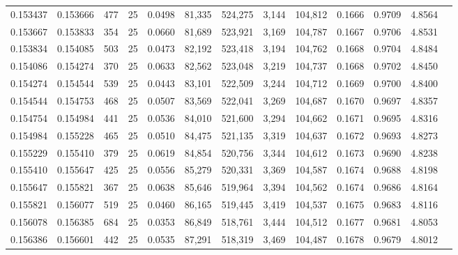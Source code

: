 \begin{tabular}{rrrrrrrrrrrrr}
0.153437 & 0.153666 &   477 &  25 &                                     0.0498 &  81,335 & 524,275 &   3,144 & 104,812 & 0.1666 & 0.9709 & 4.8564 \\
0.153667 & 0.153833 &   354 &  25 &                                     0.0660 &  81,689 & 523,921 &   3,169 & 104,787 & 0.1667 & 0.9706 & 4.8531 \\
0.153834 & 0.154085 &   503 &  25 &                                     0.0473 &  82,192 & 523,418 &   3,194 & 104,762 & 0.1668 & 0.9704 & 4.8484 \\
0.154086 & 0.154274 &   370 &  25 &                                     0.0633 &  82,562 & 523,048 &   3,219 & 104,737 & 0.1668 & 0.9702 & 4.8450 \\
0.154274 & 0.154544 &   539 &  25 &                                     0.0443 &  83,101 & 522,509 &   3,244 & 104,712 & 0.1669 & 0.9700 & 4.8400 \\
0.154544 & 0.154753 &   468 &  25 &                                     0.0507 &  83,569 & 522,041 &   3,269 & 104,687 & 0.1670 & 0.9697 & 4.8357 \\
0.154754 & 0.154984 &   441 &  25 &                                     0.0536 &  84,010 & 521,600 &   3,294 & 104,662 & 0.1671 & 0.9695 & 4.8316 \\
0.154984 & 0.155228 &   465 &  25 &                                     0.0510 &  84,475 & 521,135 &   3,319 & 104,637 & 0.1672 & 0.9693 & 4.8273 \\
0.155229 & 0.155410 &   379 &  25 &                                     0.0619 &  84,854 & 520,756 &   3,344 & 104,612 & 0.1673 & 0.9690 & 4.8238 \\
0.155410 & 0.155647 &   425 &  25 &                                     0.0556 &  85,279 & 520,331 &   3,369 & 104,587 & 0.1674 & 0.9688 & 4.8198 \\
0.155647 & 0.155821 &   367 &  25 &                                     0.0638 &  85,646 & 519,964 &   3,394 & 104,562 & 0.1674 & 0.9686 & 4.8164 \\
0.155821 & 0.156077 &   519 &  25 &                                     0.0460 &  86,165 & 519,445 &   3,419 & 104,537 & 0.1675 & 0.9683 & 4.8116 \\
0.156078 & 0.156385 &   684 &  25 &                                     0.0353 &  86,849 & 518,761 &   3,444 & 104,512 & 0.1677 & 0.9681 & 4.8053 \\
0.156386 & 0.156601 &   442 &  25 &                                     0.0535 &  87,291 & 518,319 &   3,469 & 104,487 & 0.1678 & 0.9679 & 4.8012 \\

\end{tabular}
